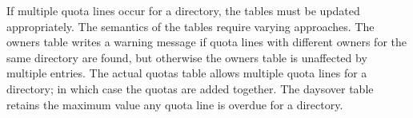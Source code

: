 
If multiple quota lines occur for a directory, the tables must be
updated appropriately. The semantics of the tables require varying
approaches. The owners table writes a warning message if quota lines
with different owners for the same directory are found, but otherwise
the owners table is unaffected by multiple entries. The actual quotas
table allows multiple quota lines for a directory; in which case the
quotas are added together. The daysover table retains the maximum value
any quota line is overdue for a directory. 

